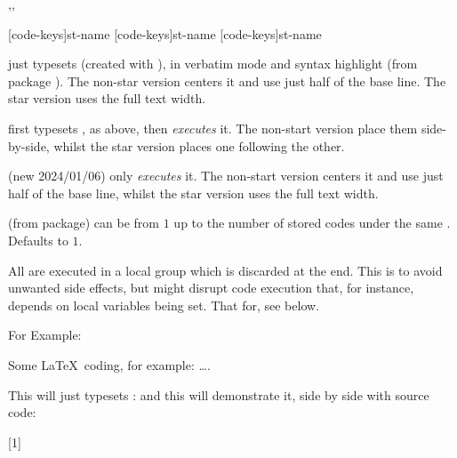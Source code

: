 \documentclass{article}
\begin{document}
\begin{codedescribe}[code,update=2024/01/06,update=2025/04/29]{\tscode*,\tsdemo*,\tsresult*}
	\begin{codesyntax}%
		\tsmacro{\tscode*}[code-keys]{st-name}
		\tsmacro{\tsdemo*}[code-keys]{st-name}
		\tsmacro{\tsresult*}[code-keys]{st-name}
	\end{codesyntax}
\tsmacro{\tscode*}{} just typesets  (created with ), in verbatim mode and syntax highlight (from  package \cite{listings}). The non-star version centers it and use just half of the base line. The star version uses the full text width.

\tsmacro{\tsdemo*}{} first typesets , as above, then \emph{executes} it. The non-start version place them side-by-side, whilst the star version places one following the other.

(new 2024/01/06) \tsmacro{\tsresult*}{} only \emph{executes} it. The non-start version centers it and use just half of the base line, whilst the star version uses the full text width.

\end{codedescribe}
\begin{tsremark}
  (from  package)  can be from $1$ up to the number of stored codes under the same . Defaults to $1$.
\end{tsremark}

\begin{tsremark}
  All are executed in a local group which is discarded at the end. This is to avoid unwanted side effects, but might disrupt code execution that, for instance, depends on local variables being set. That for, see \tsobj{\tsexec} below.
\end{tsremark}

For Example:
\begin{codestore}[st=democodestore]
\begin{codestore}[stmeta]
		Some \LaTeX~coding, for example: \ldots.
\end{codestore}  
This will just typesets :
and this will demonstrate it, side by side with source code:
\end{codestore}
[1]
\end{document}
